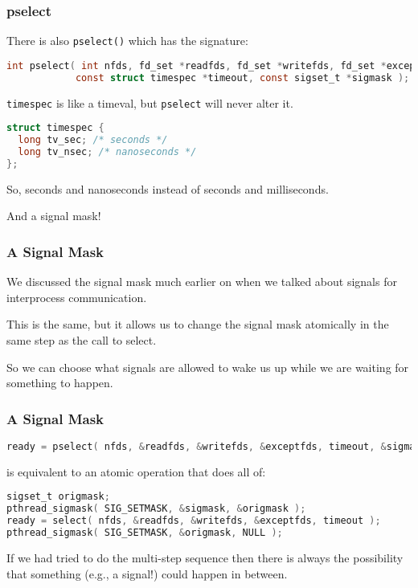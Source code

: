 \begin{frame}[fragile]
	\frametitle{pselect}

	There is also \texttt{pselect()} which has the signature:
	\begin{lstlisting}[language=C]
int pselect( int nfds, fd_set *readfds, fd_set *writefds, fd_set *exceptfds, 
            const struct timespec *timeout, const sigset_t *sigmask );
\end{lstlisting}

	\texttt{timespec} is like a timeval, but \texttt{pselect} will never alter it.

	\begin{lstlisting}[language=C]
struct timespec {
  long tv_sec; /* seconds */
  long tv_nsec; /* nanoseconds */
};
\end{lstlisting}

	So, seconds and nanoseconds instead of seconds and milliseconds.

	And a signal mask!

\end{frame}


\begin{frame}
	\frametitle{A Signal Mask}

	We discussed the signal mask much earlier on when we talked about signals for interprocess communication.

	This is the same, but it allows us to change the signal mask atomically in the same step as the call to select.

	So we can choose what signals are allowed to wake us up while we are waiting for something to happen.


\end{frame}

\begin{frame}[fragile]
	\frametitle{A Signal Mask}

	\begin{lstlisting}[language=C]
ready = pselect( nfds, &readfds, &writefds, &exceptfds, timeout, &sigmask );
\end{lstlisting}

	is equivalent to an atomic operation that does all of:

	\begin{lstlisting}[language=C]
sigset_t origmask;
pthread_sigmask( SIG_SETMASK, &sigmask, &origmask );
ready = select( nfds, &readfds, &writefds, &exceptfds, timeout );
pthread_sigmask( SIG_SETMASK, &origmask, NULL );
\end{lstlisting}

	If we had tried to do the multi-step sequence then there is always the possibility that something (e.g., a signal!) could happen in between.

\end{frame}



